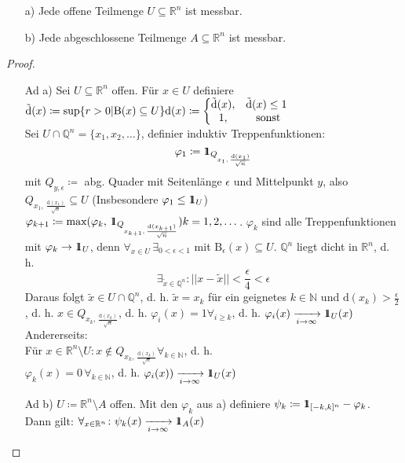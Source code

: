 \begin{lemma}
    \begin{itemize}
        \item[a)] Jede offene Teilmenge $U\subseteq\mathbb{R}^n$ ist messbar.
        \item[b)] Jede abgeschlossene Teilmenge $A\subseteq\mathbb{R}^n$ ist messbar. 
    \end{itemize}
\end{lemma}
\begin{proof}
    \begin{itemize}
        \item[Ad a)] Sei $U\subseteq\mathbb{R}^n$ offen. Für $x\in U$ definiere $\tilde{\text{d}}(x) \coloneqq \text{sup}\{r>0|\text{B}(x)\subseteq U\}\\
        \text{d}(x) \coloneqq \left\{\begin{matrix}
            \tilde{\text{d}}(x), & \tilde{\text{d}}(x)\leq 1\\
            1, & \text{ sonst}
        \end{matrix}\right.$\\
        Sei $U \cap \mathbb{Q}^n =\{x_1,x_2,\dots\}$, definier induktiv Treppenfunktionen: \begin{equation*}
            \varphi_1\coloneqq \id_{Q_{x_1, \,\frac{\text{d}(x_1)}{\sqrt{n}}}}
        \end{equation*} mit $Q_{y,\epsilon}\coloneqq$ abg. Quader mit Seitenlänge $\epsilon$ und Mittelpunkt $y$, also $Q_{x_1, \,\frac{\text{d}(x_1)}{\sqrt{n}}} \subseteq U$ (Insbesondere $\varphi_1 \leq \id_U$)\\
        $\varphi_{k+1}\coloneqq\text{max}(\varphi_k,\, \id_{Q_{x_{k+1}, \,\frac{\text{d}(x_{k+1})}{\sqrt{n}}}}) k=1,2,\dots$. $\varphi_k$ sind alle Treppenfunktionen mit $\varphi_k \to \id_U$, denn $\forall_{x\in U} \,\exists_{0<\epsilon<1}$ mit $\text{B}_{\epsilon} (x) \subseteq U$. $\mathbb{Q}^n$ liegt dicht in $\mathbb{R}^n$, d. h. \[\exists_{\tilde{x}\in\mathbb{Q}^n}\colon ||x-\tilde{x}|| < \frac{\epsilon}{4}<\epsilon\]
        Daraus folgt $\tilde{x}\in U\cap\mathbb{Q}^n$, d. h. $\tilde{x}=x_k$ für ein geignetes $k\in\mathbb{N}$ und $\text{d}(x_k) > \frac{\epsilon}{2}$, d. h. $x\in Q_{x_k, \, \frac{\text{d}(x_k)}{\sqrt{n}}}$, d. h. $\varphi_i(x)= 1 \forall_{i \geq k}$, d. h. $\varphi_i(x)\xrightarrow[i\to\infty]{}\id_U(x)$\\
        Andererseits:\\
        Für $x\in\mathbb{R}^n\setminus U \colon x\notin Q_{x_k, \, \frac{\text{d}(x_k)}{\sqrt{n}}} \forall_{k\in\mathbb{N}}$, d. h.\\ $\varphi_k(x) = 0 \, \forall_{k\in\mathbb{N}}$, d. h. $\varphi_i(x))\xrightarrow[i\to\infty]{}\id_U(x)$
        \item[Ad b)] $U \coloneqq \mathbb{R}^n \setminus A$ offen. Mit den $\varphi_k$ aus a) definiere $\psi_k \coloneqq \id_{[-k,k]^n}-\varphi_k$.\\
        Dann gilt: $\forall_{x\in\mathbb{R}^n}\colon \psi_k (x) \xrightarrow[i\to\infty]{}\id_A(x)$
    \end{itemize}
\end{proof}